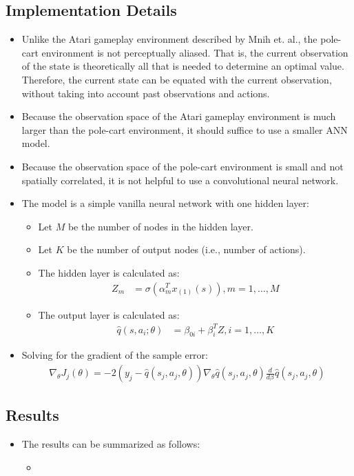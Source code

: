 \documentclass[a4paper]{article}
\begin{document}
\subsection*{Implementation Details}
\begin{itemize}
    \item Unlike the Atari gameplay environment described by Mnih et. al., the
        pole-cart environment is not perceptually aliased. That is, the current
        observation of the state is theoretically all that is needed to
        determine an optimal value. Therefore, the current state can be equated
        with the current observation, without taking into account past
        observations and actions.
    \item Because the observation space of the Atari gameplay environment is
        much larger than the pole-cart environment, it should suffice to use a
        smaller ANN model.
    \item Because the observation space of the pole-cart environment is small
        and not spatially correlated, it is not helpful to use a convolutional
        neural network.
    \item The model is a simple vanilla neural network with one hidden layer:
    \begin{itemize}
        \item Let $M$ be the number of nodes in the hidden layer.
        \item Let $K$ be the number of output nodes (i.e., number of actions).
        \item The hidden layer is calculated as:
        \begin{align*}
            Z_{m} &= \sigma(\alpha^{T}_{m}x_{(1)}(s)), m = 1, \dots, M
        \end{align*}
        \item The output layer is calculated as:
        \begin{align*}
            \hat{q}(s, a_i; \theta) &= \beta_{0i} + \beta^{T}_{i}Z, i = 1, \dots, K
        \end{align*}
    \end{itemize}
    \item Solving for the gradient of the sample error:
    \begin{align*}
        \nabla_{\theta}J_j(\theta) = -2(y_j - \hat{q}(s_j, a_j, \theta))
        \nabla_{\theta}\hat{q}(s_j, a_j, \theta)
        \frac{d}{d\beta_{}}\hat{q}(s_j, a_j, \theta) 
    \end{align*}
\end{itemize}
\subsection*{Results}
\begin{centering}
\end{centering}
\begin{itemize}
    \item The results can be summarized as follows:
    \begin{itemize}
        \item 
    \end{itemize}
\end{itemize}
\end{document}
